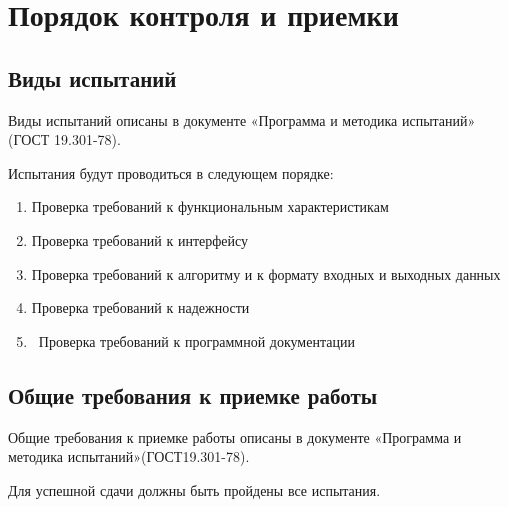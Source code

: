 \documentclass[a4paper,12pt,reqno]{article}
\begin{document}
						\newpage
	\section{Порядок контроля и приемки}
	\subsection{Виды испытаний}
	Виды испытаний описаны в документе «Программа и методика испытаний» (ГОСТ 19.301-78).
	
	
	\indent
	Испытания будут проводиться в следующем порядке: 
	\begin{enumerate}
		\item Проверка требований к функциональным характеристикам
		\item Проверка требований к интерфейсу
		\item Проверка требований к алгоритму и к формату входных и выходных данных
		\item Проверка требований к надежности
		\item Проверка требований к программной документации
	\end{enumerate}
	\subsection{Общие требования к приемке работы}
	Общие требования к приемке работы описаны в документе «Программа и методика испытаний»(ГОСТ19.301-78).
	
	\indent
	Для успешной сдачи должны быть пройдены все испытания.
	
	

	
						\newpage
	
\end{document}
